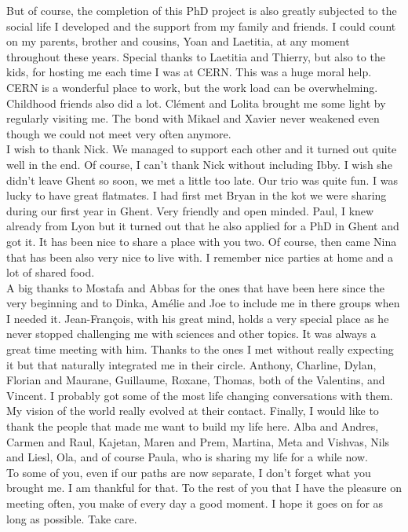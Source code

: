 \documentclass[10pt,a4paper,twoside,dutch,english,openright,leqno]{book}
\begin{document}
	But of course, the completion of this PhD project is also greatly subjected to the social life I developed and the support from my family and friends. I could count on my parents, brother and cousins, Yoan and Laetitia, at any moment throughout these years. Special thanks to Laetitia and Thierry, but also to the kids, for hosting me each time I was at CERN. This was a huge moral help. CERN is a wonderful place to work, but the work load can be overwhelming. Childhood friends also did a lot. Clément and Lolita brought me some light by regularly visiting me. The bond with Mikael and Xavier never weakened even though we could not meet very often anymore.\\
	I wish to thank Nick. We managed to support each other and it turned out quite well in the end. Of course, I can't thank Nick without including Ibby. I wish she didn't leave Ghent so soon, we met a little too late. Our trio was quite fun. I was lucky to have great flatmates. I had first met Bryan in the kot we were sharing during our first year in Ghent. Very friendly and open minded. Paul, I knew already from Lyon but it turned out that he also applied for a PhD in Ghent and got it. It has been nice to share a place with you two. Of course, then came Nina that has been also very nice to live with. I remember nice parties at home and a lot of shared food.\\
	A big thanks to Mostafa and Abbas for the ones that have been here since the very beginning and to Dinka, Amélie and Joe to include me in there groups when I needed it. Jean-François, with his great mind, holds a very special place as he never stopped challenging me with sciences and other topics. It was always a great time meeting with him. Thanks to the ones I met without really expecting it but that naturally integrated me in their circle. Anthony, Charline, Dylan, Florian and Maurane, Guillaume, Roxane, Thomas, both of the Valentins, and Vincent. I probably got some of the most life changing conversations with them. My vision of the world really evolved at their contact. Finally, I would like to thank the people that made me want to build my life here. Alba and Andres, Carmen and Raul, Kajetan, Maren and Prem, Martina, Meta and Vishvas, Nils and Liesl, Ola, and of course Paula, who is sharing my life for a while now.\\
	
	To some of you, even if our paths are now separate, I don't forget what you brought me. I am thankful for that. To the rest of you that I have the pleasure on meeting often, you make of every day a good moment. I hope it goes on for as long as possible. Take care.
\end{document}
